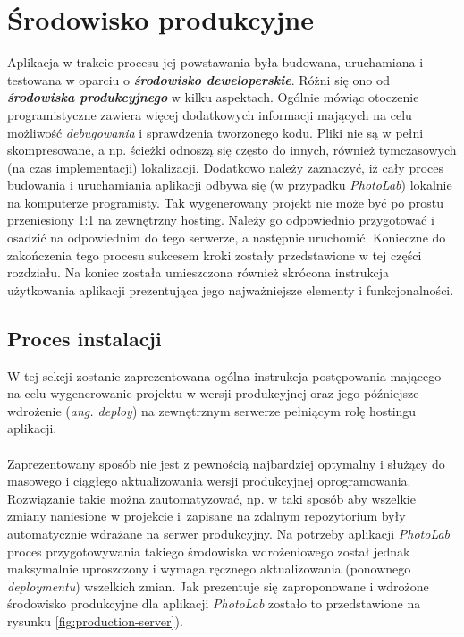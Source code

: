 \section{Środowisko produkcyjne}
\quad Aplikacja w trakcie procesu jej powstawania była budowana, uruchamiana i testowana w oparciu o \textit{\textbf{środowisko deweloperskie}}. Różni się ono od \textit{\textbf{środowiska produkcyjnego}} w kilku aspektach. Ogólnie mówiąc otoczenie programistyczne zawiera więcej dodatkowych informacji mających na celu możliwość \textit{debugowania} i sprawdzenia tworzonego kodu. Pliki nie są w pełni skompresowane, a np. ścieżki odnoszą się często do innych, również tymczasowych (na czas implementacji) lokalizacji. Dodatkowo należy zaznaczyć, iż cały proces budowania i uruchamiania aplikacji odbywa się (w przypadku \textit{PhotoLab}) lokalnie na komputerze programisty. Tak wygenerowany projekt nie może być po prostu przeniesiony 1:1 na zewnętrzny hosting. Należy go odpowiednio przygotować i osadzić na odpowiednim do tego serwerze, a następnie uruchomić. Konieczne do zakończenia tego procesu sukcesem kroki zostały przedstawione w tej części rozdziału. Na koniec została umieszczona również skrócona instrukcja użytkowania aplikacji prezentująca jego najważniejsze elementy i funkcjonalności.

\subsection{Proces instalacji}
\quad W tej sekcji zostanie zaprezentowana ogólna instrukcja postępowania mającego na celu wygenerowanie projektu w wersji produkcyjnej oraz jego późniejsze wdrożenie (\textit{ang. deploy}) na zewnętrznym serwerze pełniącym rolę hostingu aplikacji.\\
\\
Zaprezentowany sposób nie jest z pewnością najbardziej optymalny i służący do masowego i ciągłego aktualizowania wersji produkcyjnej oprogramowania. Rozwiązanie takie można zautomatyzować, np. w taki sposób aby wszelkie zmiany naniesione w projekcie i~zapisane na zdalnym repozytorium były automatycznie wdrażane na serwer produkcyjny. Na potrzeby aplikacji \textit{PhotoLab} proces przygotowywania takiego środowiska wdrożeniowego został jednak maksymalnie uproszczony i wymaga ręcznego aktualizowania (ponownego \textit{deploymentu}) wszelkich zmian. Jak prezentuje się zaproponowane i wdrożone środowisko produkcyjne dla aplikacji \textit{PhotoLab} zostało to przedstawione na rysunku \ref{fig:production-server}).

